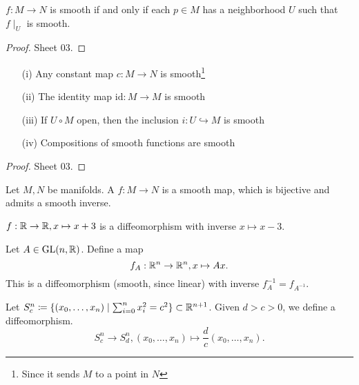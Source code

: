 \begin{lemma}\label{lem:2.2}
    \(f:M\to N\) is smooth if and only if each \(p\in M\) has a neighborhood \(U\) such that \(f\mid_U\) is smooth.
\end{lemma}

\begin{proof}
    Sheet 03.
\end{proof}

\begin{lemma}
    \begin{enumerate}
        \item[(i)] Any constant map \(c:M\to N\) is smooth\footnote{Since it sends \(M\) to a point in \(N\)}
        \item[(ii)] The identity map \(\text{id}:M\to M\) is smooth 
        \item[(iii)] If \(U \circ M\) open, then the inclusion \(i:U\hookrightarrow  M\) is smooth
        \item[(iv)] Compositions of smooth functions are smooth
    \end{enumerate}
\end{lemma}

\begin{proof}
    Sheet 03.
\end{proof}

\begin{definition*}
    Let \(M,N\) be manifolds. A  \(f:M\to N\) is a smooth 
    map, which is bijective and admits a smooth inverse.
\end{definition*}

\begin{example}
    \(f:\mathbb{R}\to\mathbb{R},x\mapsto x+3\) is a diffeomorphism with inverse \(x\mapsto x-3\).  
\end{example}

\begin{example}
    Let \(A\in\text{GL}(n,\mathbb{R})\). Define a map \[f_A:\mathbb{R}^n\to\mathbb{R}^n,x\mapsto Ax.\]
    This is a diffeomorphism (smooth, since linear) with inverse \(f_A^{-1}=f_{A^{-1}}\).  
\end{example}

\begin{example}
    Let \(S_c^n\coloneqq \{(x_0,\dots,x_n)\mid \sum_{i=0}^n x_i^2=c^2\}\subset\mathbb{R}^{n+1}\). Given 
    \(d>c>0\), we define a diffeomorphism. 
    \[S_c^n\to S_d^n, (x_0,\dots,x_n)\mapsto \frac{d}{c}(x_0,\dots,x_n).\]
\end{example}

